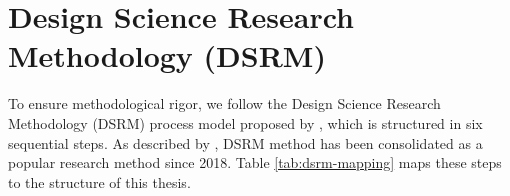 \section{Design Science Research Methodology (DSRM)}
\label{sec:dsrm-process}

To ensure methodological rigor, we follow the Design Science Research Methodology (DSRM) process model proposed by , which is structured in six sequential steps. As described by \cite{pimentel_2020}, DSRM method has been consolidated as a popular research method since 2018. Table \ref{tab:dsrm-mapping} maps these steps to the structure of this thesis.

